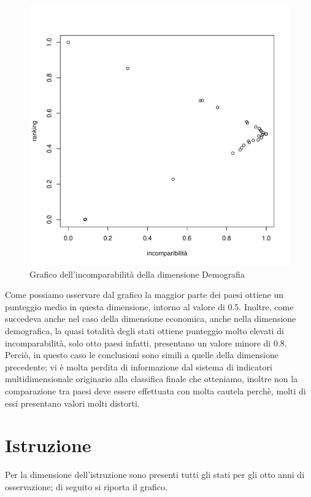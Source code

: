 \documentclass[a4paper,12pt, openright]{report}
\begin{document}
\begin{figure}[H]
    \centering
    \includegraphics[scale=.5]{plot_incom_dem.pdf}
    \caption{Grafico dell'incomparabilità della dimensione Demografia}
\end{figure}

Come possiamo osservare dal grafico la maggior parte dei paesi ottiene un punteggio medio in questa dimensione, intorno al valore di 0.5. Inoltre, come succedeva anche nel caso della
dimensione economica, anche nella dimensione demografica, la quasi totalità degli stati ottiene punteggio molto elevati di incomparabilità, solo otto paesi infatti, presentano
un valore minore di 0.8. Perciò, in questo caso le conclusioni sono simili a quelle della dimensione precedente; vi è molta perdita di informazione dal sistema di indicatori 
multidimensionale originario alla classifica finale che otteniamo, inoltre non la comparazione tra paesi deve essere effettuata con molta cautela perchè, molti di essi
presentano valori molti distorti. 


\newpage


\section{Istruzione}


Per la dimensione dell'istruzione sono presenti tutti gli stati per gli otto anni di osservazione; di seguito si riporta il grafico. 
\end{document}
